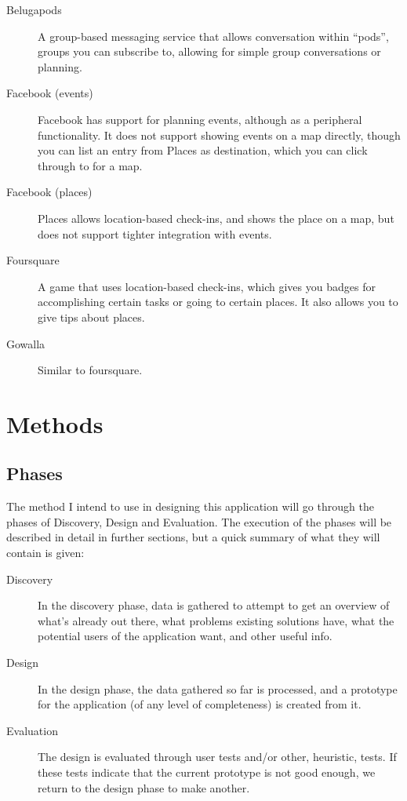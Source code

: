 \documentclass[]{report}
\let\oldmarginpar\marginpar
\renewcommand\marginpar[1]{\-\oldmarginpar[\raggedleft\footnotesize #1]%
{\raggedright\footnotesize #1}}
\begin{document}
\begin{description}
\item[Belugapods] A group-based messaging service that allows conversation
  within ``pods'', groups you can subscribe to, allowing for simple group
  conversations or planning.\cite{site:belugapods}
\item[Facebook (events)] Facebook has support for planning events, although as a
  peripheral functionality. It does not support showing events on a map
  directly, though you can list an entry from Places as destination, which you
  can click through to for a map.\cite{site:facebook}
\item[Facebook (places)] Places allows location-based check-ins, and shows the
  place on a map, but does not support tighter integration with events.\cite{site:facebook}
\item[Foursquare] A game that uses location-based check-ins, which gives you
  badges for accomplishing certain tasks or going to certain places. It also
  allows you to give tips about places.\cite{site:foursquare}
\item[Gowalla] Similar to foursquare.\cite{site:gowalla}\marginpar{Fill out more here}
\end{description}

\chapter{Methods}

\section{Phases}

The method I intend to use in designing this application will go through the
phases of Discovery, Design and Evaluation. The execution of the phases will be
described in detail in further sections, but a quick summary of what they will
contain is given:

\begin{description}
\item[Discovery] In the discovery phase, data is gathered to attempt to get an
  overview of what's already out there, what problems existing solutions have,
  what the potential users of the application want, and other useful info.
\item[Design] In the design phase, the data gathered so far is processed, and a
  prototype for the application (of any level of completeness) is created from
  it.
\item[Evaluation] The design is evaluated through user tests and/or other,
  heuristic, tests. If these tests indicate that the current prototype is not
  good enough, we return to the design phase to make another.
\end{description}
\end{document}

